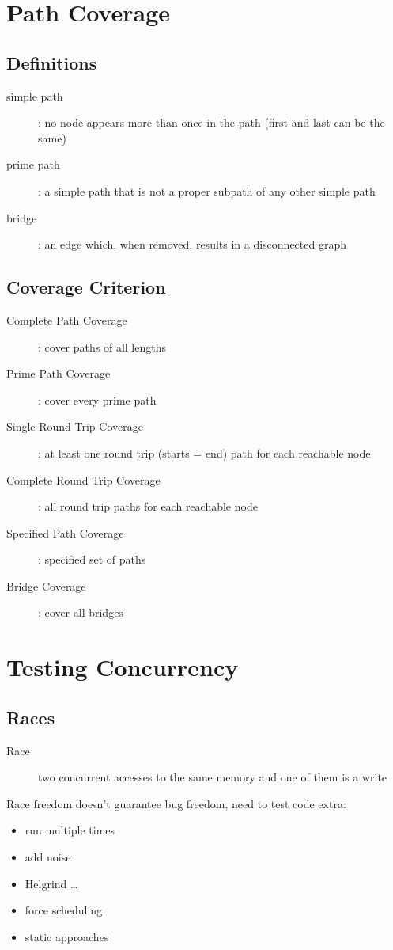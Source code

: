 \documentclass[]{article}
\theoremstyle{definition}
\begin{document}
	\section{Path Coverage}
		\subsection{Definitions}
			\begin{description}
				\item[simple path]: no node appears more than once in the path (first and last can be the same)
				\item[prime path]: a simple path that is not a proper subpath of any other simple path
				\item[bridge]: an edge which, when removed, results in a disconnected graph
			\end{description}
			
		\subsection{Coverage Criterion}
			\begin{description}
				\item[Complete Path Coverage]: cover paths of all lengths
				\item[Prime Path Coverage]: cover every prime path
				\item[Single Round Trip Coverage]: at least one round trip (starts = end) path for each reachable node
				\item[Complete Round Trip Coverage]: all round trip paths for each reachable node
				\item[Specified Path Coverage]: specified set of paths
				\item[Bridge Coverage]: cover all bridges
			\end{description}
	\section{Testing Concurrency}
		\subsection{Races}
			\begin{description}
				\item[Race] two concurrent accesses to the same memory and one of them is a write
			\end{description}
			
			Race freedom doesn't guarantee bug freedom, need to test code extra:
			\begin{itemize}
				\item run multiple times
				\item add noise
				\item Helgrind \ldots
				\item force scheduling
				\item static approaches
			\end{itemize}
\end{document}
